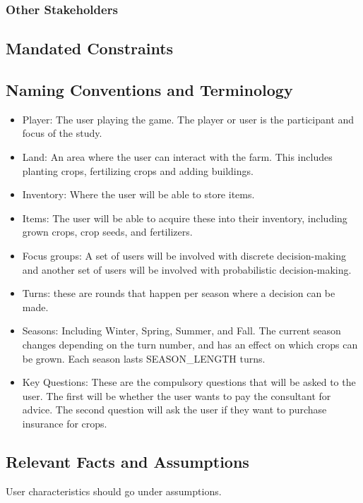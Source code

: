 \documentclass{article}
\begin{document}
\subsubsection{Other Stakeholders}

\subsection{Mandated Constraints}

\subsection{Naming Conventions and Terminology}
\begin{itemize}
  \item Player: The user playing the game. The player or user is the participant and focus of the study.
  \item Land: An area where the user can interact with the farm. This includes planting crops, fertilizing crops and adding buildings.
  \item Inventory: Where the user will be able to store items.
  \item Items: The user will be able to acquire these into their inventory, including grown crops, crop seeds, and fertilizers.
  \item Focus groups: A set of users will be involved with discrete decision-making and another set of users will be involved with probabilistic decision-making.
  \item Turns: these are rounds that happen per season where a decision can be made. 
  \item Seasons: Including Winter, Spring, Summer, and Fall. The current season changes depending on the turn number, and has an effect on which crops can be grown. Each season lasts SEASON\_LENGTH turns.
  \item Key Questions: These are the compulsory questions that will be asked to the user. The first will be whether the user wants to pay the consultant for advice. The second question will ask the user if they want to purchase insurance for crops.
\end{itemize}

\subsection{Relevant Facts and Assumptions}

User characteristics should go under assumptions.
\end{document}
